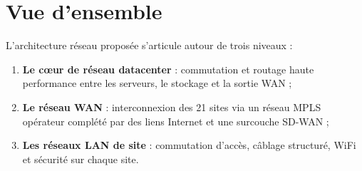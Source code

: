 \documentclass[12pt,a4paper]{report}
\begin{document}
\section{Vue d'ensemble}

L'architecture réseau proposée s'articule autour de trois niveaux :

\begin{enumerate}
\item \textbf{Le c\oe ur de réseau datacenter} : commutation et routage haute performance entre les serveurs, le stockage et la sortie WAN ;
\item \textbf{Le réseau WAN} : interconnexion des 21 sites via un réseau MPLS opérateur complété par des liens Internet et une surcouche SD-WAN ;
\item \textbf{Les réseaux LAN de site} : commutation d'accès, câblage structuré, WiFi et sécurité sur chaque site.
\end{enumerate}
\end{document}
